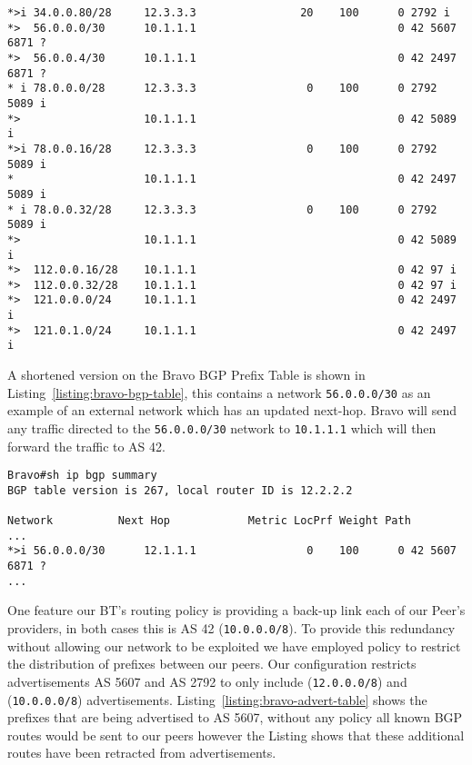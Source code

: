 \begin{lstlisting}[caption={Extract of Alpha BGP Table}, label={listing:bgp-table}]
*>i 34.0.0.80/28     12.3.3.3                20    100      0 2792 i
*>  56.0.0.0/30      10.1.1.1                               0 42 5607 6871 ?
*>  56.0.0.4/30      10.1.1.1                               0 42 2497 6871 ?
* i 78.0.0.0/28      12.3.3.3                 0    100      0 2792 5089 i
*>                   10.1.1.1                               0 42 5089 i
*>i 78.0.0.16/28     12.3.3.3                 0    100      0 2792 5089 i
*                    10.1.1.1                               0 42 2497 5089 i
* i 78.0.0.32/28     12.3.3.3                 0    100      0 2792 5089 i
*>                   10.1.1.1                               0 42 5089 i
*>  112.0.0.16/28    10.1.1.1                               0 42 97 i
*>  112.0.0.32/28    10.1.1.1                               0 42 97 i
*>  121.0.0.0/24     10.1.1.1                               0 42 2497 i
*>  121.0.1.0/24     10.1.1.1                               0 42 2497 i
\end{lstlisting}

A shortened version on the Bravo BGP Prefix Table is shown in Listing~\ref{listing:bravo-bgp-table}, this contains a network \texttt{56.0.0.0/30} as an example of an external network which has an updated next-hop. Bravo will send any traffic directed to the \texttt{56.0.0.0/30} network to \texttt{10.1.1.1} which will then forward the traffic to AS 42.

\begin{lstlisting}[caption={Extract of Bravo BGP Table}, label={listing:bravo-bgp-table}]
Bravo#sh ip bgp summary
BGP table version is 267, local router ID is 12.2.2.2

Network          Next Hop            Metric LocPrf Weight Path
...
*>i 56.0.0.0/30      12.1.1.1                 0    100      0 42 5607 6871 ?
...
\end{lstlisting}

One feature our BT's routing policy is providing a back-up link each of our Peer's providers, in both cases this is AS 42 (\texttt{10.0.0.0/8}). To provide this redundancy without allowing our network to be exploited we have employed policy to restrict the distribution of prefixes between our peers. Our configuration restricts advertisements AS 5607 and AS 2792 to only include (\texttt{12.0.0.0/8}) and (\texttt{10.0.0.0/8}) advertisements. Listing~\ref{listing:bravo-advert-table} shows the prefixes that are being advertised to AS 5607, without any policy all known BGP routes would be sent to our peers however the Listing shows that these additional routes have been retracted from advertisements.

